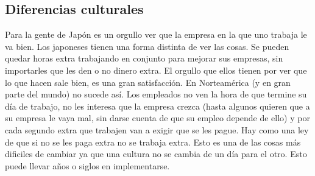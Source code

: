 	\subsection{Diferencias culturales}
	Para la gente de Jap\'on es un orgullo ver que la empresa en la que uno trabaja le va bien. Los japoneses tienen una forma distinta de ver las cosas. Se pueden quedar horas extra trabajando en conjunto para mejorar sus empresas, sin importarles que les den o no dinero extra. El orgullo que ellos tienen por ver que lo que hacen sale bien, es una gran satisfacci\'on. En Norteam\'erica (y en gran parte del mundo) no sucede así. Los empleados no ven la hora de que termine su día de trabajo, no les interesa que la empresa crezca (hasta algunos quieren que a su empresa le vaya mal, sin darse cuenta de que su empleo depende de ello) y por cada segundo extra que trabajen van a exigir que se les pague. Hay como una ley de que si no se les paga extra no se trabaja extra. Esto es una de las cosas m\'as dificiles de cambiar ya que una cultura no se cambia de un día para el otro. Esto puede llevar a\~nos o siglos en implementarse.
